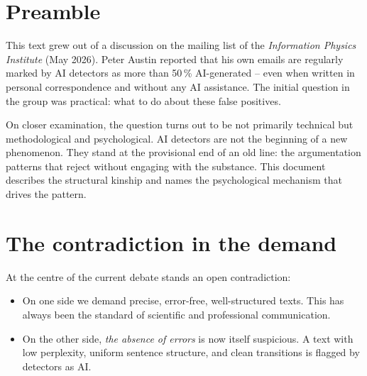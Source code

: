 
\section*{Preamble}

This text grew out of a discussion on the mailing list of the
\emph{Information Physics Institute} (May 2026). Peter Austin
reported that his own emails are regularly marked by AI detectors as
more than 50\,\% AI-generated -- even when written in personal
correspondence and without any AI assistance. The initial question
in the group was practical: what to do about these false positives.

On closer examination, the question turns out to be not primarily
technical but methodological and psychological. AI detectors are
not the beginning of a new phenomenon. They stand at the provisional
end of an old line: the argumentation patterns that reject without
engaging with the substance. This document describes the structural
kinship and names the psychological mechanism that drives the pattern.

\section{The contradiction in the demand}

At the centre of the current debate stands an open contradiction:

\begin{itemize}[leftmargin=2em,itemsep=2pt,topsep=2pt]
  \item On one side we demand precise, error-free, well-structured
        texts. This has always been the standard of scientific and
        professional communication.
  \item On the other side, \emph{the absence of errors} is now
        itself suspicious. A text with low perplexity, uniform
        sentence structure, and clean transitions is flagged by
        detectors as AI.
\end{itemize}

